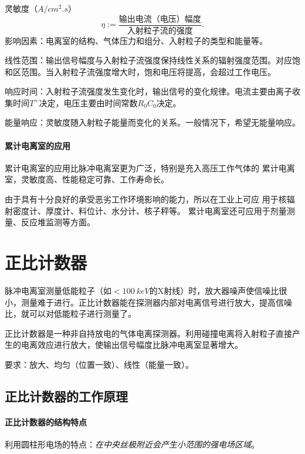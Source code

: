 灵敏度（$\si{A/cm^2.s}$）
\[
	\eta:=\frac{\text{输出电流（电压）幅度}}{\text{入射粒子流的强度}}.
\]
影响因素：电离室的结构、气体压力和组分、入射粒子的类型和能量等。

线性范围：输出信号幅度与入射粒子流强度保持线性关系的辐射强度范围。对应饱和区范围。当入射粒子流强度增大时，饱和电压将提高，会超过工作电压。

响应时间：入射粒子流强度发生变化时，输出信号的变化规律。电流主要由离子收集时间$T^+$决定，电压主要由时间常数$R_0C_0$决定。

能量响应：灵敏度随入射粒子能量而变化的关系。一般情况下，希望无能量响应。
\paragraph{累计电离室的应用}
累计电离室的应用比脉冲电离室更为广泛，特别是充入高压工作气体的
累计电离室，灵敏度高、性能稳定可靠、工作寿命长。

由于具有十分良好的承受恶劣工作环境影响的能力，所以在工业上可应
用于核辐射密度计、厚度计、料位计、水分计、核子秤等。
累计电离室还可应用于剂量测量、反应堆监测等方面。

\section{正比计数器}

脉冲电离室测量低能粒子（如$<\SI{100}{keV}$的X射线）时，放大器噪声使信噪比很小，测量难于进行。正比计数器能在探测器内部对电离信号进行放大，提高信噪比，就可以对低能粒子进行测量了。

正比计数器是一种非自持放电的气体电离探测器。利用碰撞电离将入射粒子直接产生的电离效应进行放大，使输出信号幅度比脉冲电离室显著增大。

要求：放大、均匀（位置一致）、线性（能量一致）。

\subsection{正比计数器的工作原理}

\paragraph{正比计数器的结构特点}
利用圆柱形电场的特点：\textit{在中央丝极附近会产生小范围的强电场区域}。


